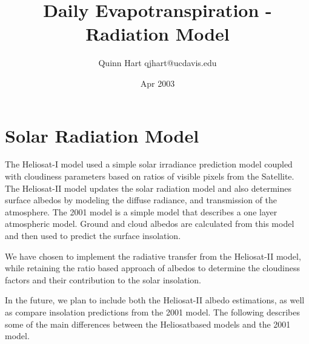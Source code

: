 \documentclass[letterpaper]{article}
\title{Daily Evapotranspiration - Radiation Model}
\author{Quinn Hart qjhart@ucdavis.edu}
\date{Apr 2003}
\newcommand{\hel}{Heliosat}
\begin{document}
\maketitle

\section{Solar Radiation Model}

The \hel-I model used a simple solar irradiance prediction model
coupled with cloudiness parameters based on ratios of visible pixels
from the Satellite.  The \hel-II model updates the solar radiation
model and also determines surface albedos by modeling the diffuse
radiance, and transmission of the atmosphere.  The 2001 model is a
simple model that describes a one layer atmospheric model.  Ground and
cloud albedos are calculated from this model and then used to predict
the surface insolation.

We have chosen to implement the radiative transfer from the \hel-II
model, while retaining the ratio based approach of albedos to
determine the cloudiness factors and their contribution to the solar
insolation.

In the future, we plan to include both the \hel-II albedo estimations,
as well as compare insolation predictions from the 2001 model.  The
following describes some of the main differences between the \hel based
models and the 2001 model.
\end{document}
